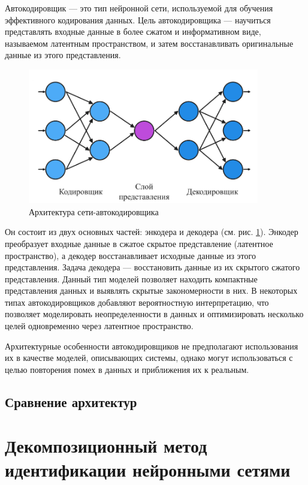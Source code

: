 Автокодировщик — это тип нейронной сети, используемой для обучения эффективного
кодирования данных. Цель автокодировщика — научиться представлять входные
данные в более сжатом и информативном виде, называемом латентным пространством,
и затем восстанавливать оригинальные данные из этого представления. 
\begin{figure}[htbp]
  \centering
    \includegraphics[width=0.9\textwidth]{figures/arch_autoencoder.png}
  \caption{Архитектура сети-автокодировщика}\label{fig:autoencoder_nn}
\end{figure}

Он состоит из двух основных частей: энкодера и декодера (см. рис.
\ref{fig:autoencoder_nn}). Энкодер преобразует входные данные в сжатое 
скрытое представление (латентное пространство), а декодер восстанавливает 
исходные данные из этого представления. Задача декодера — восстановить данные 
из их скрытого сжатого представления. Данный тип моделей позволяет находить 
компактные представления данных и выявлять скрытые закономерности в них.
В некоторых типах автокодировщиков добавляют вероятностную интерпретацию, что
позволяет моделировать неопределенности в данных и оптимизировать несколько
целей одновременно через латентное пространство.

Архитектурные особенности автокодировщиков не предполагают использования их в
качестве моделей, описывающих системы, однако могут использоваться с целью
повторения помех в данных и приближения их к реальным.

\subsection{Сравнение архитектур}

\section{Декомпозиционный метод идентификации нейронными сетями}

